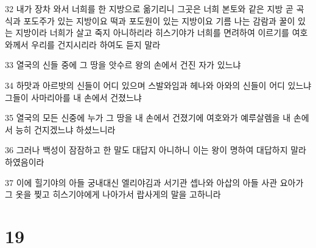 \par 32 내가 장차 와서 너희를 한 지방으로 옮기리니 그곳은 너희 본토와 같은 지방 곧 곡식과 포도주가 있는 지방이요 떡과 포도원이 있는 지방이요 기름 나는 감람과 꿀이 있는 지방이라 너희가 살고 죽지 아니하리라 히스기야가 너희를 면려하여 이르기를 여호와께서 우리를 건지시리라 하여도 듣지 말라
\par 33 열국의 신들 중에 그 땅을 앗수르 왕의 손에서 건진 자가 있느냐
\par 34 하맛과 아르밧의 신들이 어디 있으며 스발와임과 헤나와 아와의 신들이 어디 있느냐 그들이 사마리아를 내 손에서 건졌느냐
\par 35 열국의 모든 신중에 누가 그 땅을 내 손에서 건졌기에 여호와가 예루살렘을 내 손에서 능히 건지겠느냐 하셨느니라
\par 36 그러나 백성이 잠잠하고 한 말도 대답지 아니하니 이는 왕이 명하여 대답하지 말라 하였음이라
\par 37 이에 힐기야의 아들 궁내대신 엘리야김과 서기관 셉나와 아삽의 아들 사관 요아가 그 옷을 찢고 히스기야에게 나아가서 랍사게의 말을 고하니라

\chapter{19}

